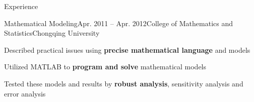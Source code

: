 \documentclass{resume} %
\begin{document}
\begin{rSection}{Experience}
		\begin{rSubsection}{Mathematical Modeling}{Apr. 2011 -- Apr. 2012}{College of Mathematics and Statistics}{Chongqing University}
			\item Described practical issues using \textbf{precise mathematical language} and models
			\item Utilized MATLAB to \textbf{program and solve} mathematical models
			\item Tested these models and results by \textbf{robust analysis}, sensitivity analysis and error analysis
		\end{rSubsection}
		
		
	\end{rSection}
	
	
\end{document}
